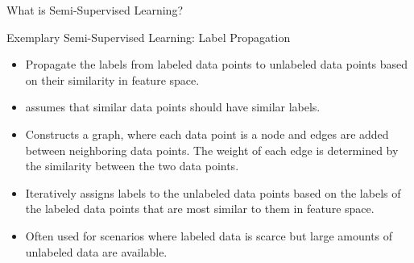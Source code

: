\documentclass[aspectratio=169]{../latex_main/tntbeamer}  %
\begin{document}
\begin{frame}[c]{What is Semi-Supervised Learning?}


    \end{frame}

    \begin{frame}{Exemplary Semi-Supervised Learning: Label Propagation}

        \begin{itemize}
            \item  Propagate the labels from labeled data points to unlabeled data points based on their similarity in feature space.
            \item assumes that similar data points should have similar labels.
            \item Constructs a graph, where each data point is a node and edges are added between neighboring data points. The weight of each edge is determined by the similarity between the two data points.
            \item Iteratively assigns labels to the unlabeled data points based on the labels of the labeled data points that are most similar to them in feature space.
            \item Often used for scenarios where labeled data is scarce but large amounts of unlabeled data are available.
        \end{itemize}
        
    \end{frame}
\end{document}

